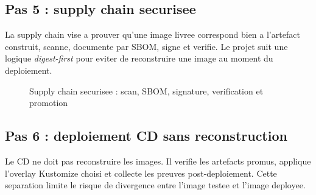 \subsection{Pas 5 : supply chain securisee}

La supply chain vise a prouver qu'une image livree correspond bien a l'artefact
construit, scanne, documente par SBOM, signe et verifie. Le projet suit une
logique \textit{digest-first} pour eviter de reconstruire une image au moment du
deploiement.

\begin{figure}[htbp]
\centering
{}
\caption{Supply chain securisee : scan, SBOM, signature, verification et promotion}
\label{fig:devsecops-supply-chain}
\end{figure}

\subsection{Pas 6 : deploiement CD sans reconstruction}

Le CD ne doit pas reconstruire les images. Il verifie les artefacts promus,
applique l'overlay Kustomize choisi et collecte les preuves post-deploiement.
Cette separation limite le risque de divergence entre l'image testee et l'image
deployee.


